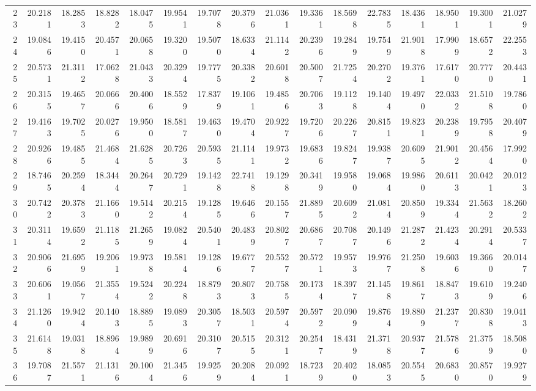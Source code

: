 \documentclass[12pt]{article}\usepackage[]{graphicx}\usepackage[]{color}
\begin{document}
\begin{landscape}
\begin{longtable}[t]{rrrrrrrrrrrrrrrr}
23 & 20.2181 & 18.2853 & 18.8282 & 18.0475 & 19.9541 & 19.7078 & 20.3796 & 21.0361 & 19.3361 & 18.5698 & 22.7835 & 18.4361 & 18.9501 & 19.3001 & 21.0279\\
24 & 19.0846 & 19.4150 & 20.4571 & 20.0658 & 19.3200 & 19.5070 & 18.6334 & 21.1142 & 20.2396 & 19.2849 & 19.7549 & 21.9018 & 17.9909 & 18.6572 & 22.2553\\
25 & 20.5731 & 21.3112 & 17.0628 & 21.0433 & 20.3294 & 19.7775 & 20.3382 & 20.6018 & 20.5007 & 21.7254 & 20.2702 & 19.3761 & 17.6170 & 20.7770 & 20.4431\\
26 & 20.3155 & 19.4657 & 20.0666 & 20.4006 & 18.5529 & 17.8379 & 19.1061 & 19.4856 & 20.7063 & 19.1128 & 19.1404 & 19.4970 & 22.0332 & 21.5108 & 19.7860\\
27 & 19.4163 & 19.7025 & 20.0276 & 19.9500 & 18.5817 & 19.4630 & 19.4704 & 20.9227 & 19.7206 & 20.2267 & 20.8151 & 19.8231 & 20.2389 & 19.7958 & 20.4079\\
28 & 20.9266 & 19.4855 & 21.4684 & 21.6285 & 20.7263 & 20.5935 & 21.1141 & 19.9732 & 19.6836 & 19.8247 & 19.9387 & 20.6095 & 21.9012 & 20.4564 & 17.9920\\
29 & 18.7465 & 20.2594 & 18.3444 & 20.2647 & 20.7291 & 19.1428 & 22.7418 & 19.1298 & 20.3419 & 19.9580 & 19.0684 & 19.9860 & 20.6113 & 20.0421 & 20.0123\\
30 & 20.7422 & 20.3783 & 21.1660 & 19.5142 & 20.2154 & 19.1285 & 19.6466 & 20.1557 & 21.8895 & 20.6092 & 21.0814 & 20.8509 & 19.3344 & 21.5632 & 18.2602\\
31 & 20.3114 & 19.6592 & 21.1185 & 21.2659 & 19.0824 & 20.5401 & 20.4839 & 20.8027 & 20.6867 & 20.7087 & 20.1496 & 21.2872 & 21.4234 & 20.2914 & 20.5337\\
32 & 20.9066 & 21.6959 & 19.2061 & 19.9738 & 19.5814 & 19.1286 & 19.6777 & 20.5527 & 20.5721 & 19.9573 & 19.9767 & 21.2508 & 19.6036 & 19.3660 & 20.0147\\
33 & 20.6061 & 19.0567 & 21.3554 & 19.5242 & 20.2248 & 18.8793 & 20.8073 & 20.7585 & 20.1734 & 18.3977 & 21.1458 & 19.8617 & 18.8473 & 19.6109 & 19.2406\\
34 & 21.1260 & 19.9424 & 20.1403 & 18.8895 & 19.0893 & 20.3057 & 18.5031 & 20.5974 & 20.5972 & 20.0909 & 19.8764 & 19.8809 & 21.2377 & 20.8308 & 19.0413\\
35 & 21.6148 & 19.0318 & 18.8964 & 19.9899 & 20.6916 & 20.3107 & 20.5155 & 20.3121 & 20.2547 & 18.4319 & 21.3718 & 20.9377 & 21.5786 & 21.3759 & 18.5080\\
36 & 19.7087 & 21.5571 & 21.1316 & 20.1004 & 21.3456 & 19.9259 & 20.2084 & 20.0921 & 18.7239 & 20.4020 & 18.0853 & 20.5545 & 20.6830 & 20.8570 & 19.9279\\

\end{longtable}
\end{landscape}
\end{document}
